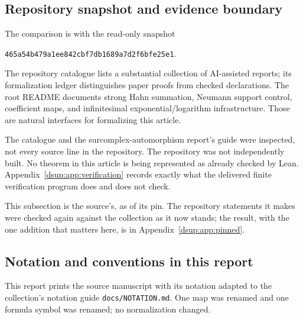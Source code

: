 \documentclass[11pt,oneside]{article}
\numberwithin{equation}{section}
\theoremstyle{definition}
\theoremstyle{remark}
\newcommand{\repo}[1]{\nolinkurl{#1}}%
\newcommand{\pin}{\texttt{465a54b479a1ee842cbf7db1689a7d2f6bfe25e1}}
\begin{document}
\subsection{Repository snapshot and evidence boundary}

The comparison is with the read-only snapshot
\begin{center}\small\pin.\end{center}
The repository catalogue \cite{RepoDocs} lists a substantial collection of
AI-assisted reports; its formalization ledger distinguishes paper proofs
from checked declarations. The root README \cite{Repo} documents strong
Hahn summation, Neumann support control, coefficient maps, and
infinitesimal exponential/logarithm infrastructure. Those are natural
interfaces for formalizing this article.

The catalogue and the surcomplex-automorphism report's guide were inspected,
not every source line in the repository. The repository was not independently
built. No theorem in this article is being represented as already checked
by Lean. Appendix~\ref{dsup:app:verification} records exactly what the delivered
finite verification program does and does not check.

This subsection is the source's, as of its pin. The repository statements
it makes were checked again against the collection as it now stands; the
result, with the one addition that matters here, is in
Appendix~\ref{dsup:app:pinned}.

\subsection{Notation and conventions in this report}\label{dsup:sec:conventions}

This report prints the source manuscript with its notation adapted to the
collection's notation guide \repo{docs/NOTATION.md}. One map was renamed and
one formula symbol was renamed; no normalization changed.
\end{document}
